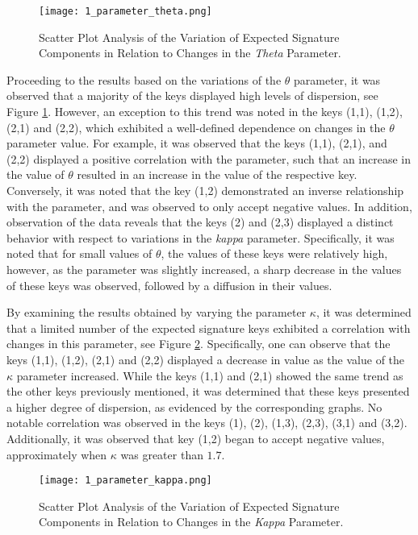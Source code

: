 \documentclass[12pt,a4paper]{report}
\theoremstyle{definition}
\begin{document}
\begin{figure}[!htbp]
	\centering
	\texttt{[image: 1\_parameter\_theta.png]}
	\caption{Scatter Plot Analysis of the Variation of Expected Signature Components in Relation to Changes in the \textit{Theta} Parameter.}
	\label{1_parameter_theta}
\end{figure}


Proceeding to the results based on the variations of the $\theta$ parameter, it was observed that a majority of the keys displayed high levels of dispersion, see Figure \ref{1_parameter_theta}. However, an exception to this trend was noted in the keys (1,1), (1,2), (2,1) and (2,2), which exhibited a well-defined dependence on changes in the $\theta$ parameter value. For example, it was observed that the keys (1,1), (2,1), and (2,2) displayed a positive correlation with the parameter, such that an increase in the value of $\theta$ resulted in an increase in the value of the respective key. Conversely, it was noted that the key (1,2) demonstrated an inverse relationship with the parameter, and was observed to only accept negative values. In addition, observation of the data reveals that the keys (2) and (2,3) displayed a distinct behavior with respect to variations in the \textit{kappa} parameter. Specifically, it was noted that for small values of $\theta$, the values of these keys were relatively high, however, as the parameter was slightly increased, a sharp decrease in the values of these keys was observed, followed by a diffusion in their values.


By examining the results obtained by varying the parameter $\kappa$, it was determined that a limited number of the expected signature keys exhibited a correlation with changes in this parameter, see Figure \ref{1_parameter_kappa}. Specifically, one can observe that the keys (1,1), (1,2), (2,1) and (2,2) displayed a decrease in value as the value of the $\kappa$ parameter increased. While the keys (1,1) and (2,1) showed the same trend as the other keys previously mentioned, it was determined that these keys presented a higher degree of dispersion, as evidenced by the corresponding graphs. No notable correlation was observed in the keys (1), (2), (1,3), (2,3), (3,1) and (3,2). Additionally, it was observed that key (1,2) began to accept negative values, approximately when $\kappa$ was greater than $1.7$.

\begin{figure}[!htbp]
	\centering
	\texttt{[image: 1\_parameter\_kappa.png]}
	\caption{Scatter Plot Analysis of the Variation of Expected Signature Components in Relation to Changes in the \textit{Kappa} Parameter.}
	\label{1_parameter_kappa}
\end{figure}
\end{document}
